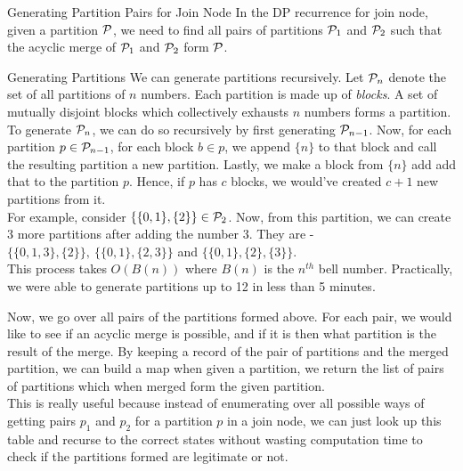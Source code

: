 \begin{section}{Generating Partition Pairs for Join Node}
	\label{section:Partition}
	In the DP recurrence for join node, given a partition $\mathcal{P}$, we need to find all pairs of partitions $\mathcal{P}_1$ and $\mathcal{P}_2$ such that the acyclic merge of $\mathcal{P}_1$ and $\mathcal{P}_2$ form $\mathcal{P}$. 
	
	\begin{subsection}{Generating Partitions}
		We can generate partitions recursively. Let $\mathcal{P}_n$ denote the set of all partitions of $n$ numbers. Each partition is made up of \textit{blocks}. A set of mutually disjoint blocks which collectively exhausts $n$ numbers forms a partition. \\
		
		To generate $\mathcal{P}_n$, we can do so recursively by first generating $\mathcal{P}_{n-1}$. Now, for each partition $p \in \mathcal{P}_{n-1}$, for each block $b \in p$, we append $\{n\}$ to that block and call the resulting partition a new partition. Lastly, we make a block from $\{n\}$ add add that to the partition $p$. Hence, if $p$ has $c$ blocks, we would've created $c+1$ new partitions from it. \\
		
		For example, consider $\{\{0, 1\}, \{2\}\} \in \mathcal{P}_2$. Now, from this partition, we can create 3 more partitions after adding the number 3. They are - $\{\{0, 1, 3\}, \{2\}\},\ \{\{0, 1\}, \{2, 3\}\}$ and $\{\{0, 1\}, \{2\}, \{3\}\}$. \\
		
		This process takes $O(B(n))$ where $B(n)$ is the $n^{th}$ bell number. Practically, we were able to generate partitions up to 12 in less than 5 minutes. 
	\end{subsection}

	Now, we go over all pairs of the partitions formed above. For each pair, we would like to see if an acyclic merge is possible, and if it is then what partition is the result of the merge. By keeping a record of the pair of partitions and the merged partition, we can build a map when given a partition, we return the list of pairs of partitions which when merged form the given partition. \\
	
	This is really useful because instead of enumerating over all possible ways of getting pairs $p_1$ and $p_2$ for a partition $p$ in a join node, we can just look up this table and recurse to the correct states without wasting computation time to check if the partitions formed are legitimate or not. \\
	

\end{section}
